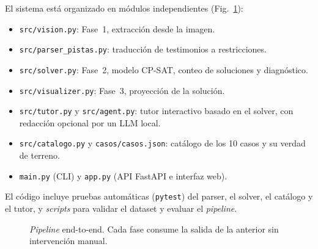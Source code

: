 \documentclass[conference,a4paper]{IEEEtran}
\begin{document}
El sistema está organizado en módulos independientes (Fig.~\ref{fig:pipeline}):
\begin{itemize}
  \item \texttt{src/vision.py}: Fase~1, extracción desde la imagen.
  \item \texttt{src/parser\_pistas.py}: traducción de testimonios a restricciones.
  \item \texttt{src/solver.py}: Fase~2, modelo CP-SAT, conteo de soluciones y diagnóstico.
  \item \texttt{src/visualizer.py}: Fase~3, proyección de la solución.
  \item \texttt{src/tutor.py} y \texttt{src/agent.py}: tutor interactivo basado en el
        solver, con redacción opcional por un LLM local.
  \item \texttt{src/catalogo.py} y \texttt{casos/casos.json}: catálogo de los 10 casos y su
        verdad de terreno.
  \item \texttt{main.py} (CLI) y \texttt{app.py} (API FastAPI e interfaz web).
\end{itemize}
El código incluye pruebas automáticas (\texttt{pytest}) del parser, el solver, el catálogo y
el tutor, y \emph{scripts} para validar el dataset y evaluar el \emph{pipeline}.

\begin{figure}[t]
\centering
\scriptsize
\setlength{\fboxsep}{3pt}
\caption{\emph{Pipeline} end-to-end. Cada fase consume la salida de la anterior sin
intervención manual.}
\label{fig:pipeline}
\end{figure}
\end{document}
